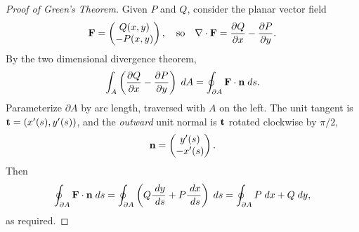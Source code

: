 \documentclass[a4paper]{scrartcl}
\begin{document}
\begin{proof}[Proof of Green's Theorem]
	Given $P$ and $Q$, consider the planar vector field
	$$
	\mathbf{F} = \begin{pmatrix}
		Q(x, y) \\ -P(x, y)
	\end{pmatrix}, \quad \text{so} \quad \nabla \cdot \mathbf{F} = \frac{\partial Q}{\partial x} - \frac{\partial P}{\partial y}.
	$$
	By the two dimensional divergence theorem,
	$$
	\int_A \left(\frac{\partial Q}{\partial x} - \frac{\partial P}{\partial y}\right) \; d A = \oint_{\partial A} \mathbf{F} \cdot \mathbf{n} \; d s.
	$$
	Parameterize $\partial A$ by arc length, traversed with $A$ on the left. The unit tangent is $\mathbf{t} = (x'(s), y'(s))$, and the \emph{outward} unit normal is $\mathbf{t}$ rotated clockwise by $\pi/2$,
	$$
	\mathbf{n} = \begin{pmatrix}
		y'(s) \\ -x'(s)
	\end{pmatrix}.
	$$
	Then
	$$
	\oint_{\partial A} \mathbf{F} \cdot \mathbf{n} \; d s = \oint_{\partial A} \left(Q \frac{\; d y}{\; d s} + P \frac{\; d x}{\; d s}\right) \; d s = \oint_{\partial A} P \; d x + Q \; d y,
	$$
	as required.
\end{proof}
\end{document}
